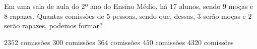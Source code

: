 Em uma sala de aula do 2º ano do Ensino Médio, há $17$ alunos, sendo $9$ moças e $8$ rapazes. Quantas comissões de $5$ pessoas, sendo que, dessas, $3$ serão moças e $2$ serão rapazes, podemos formar?

$2352$ comissões
$300$ comissões
$364$ comissões
$450$ comissões
$4320$ comissões



